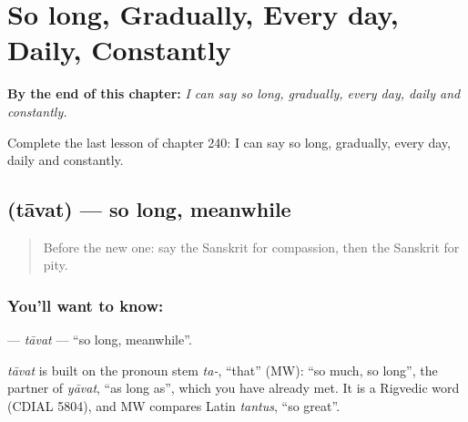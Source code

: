 
\chapter{So long, Gradually, Every day, Daily, Constantly}
\label{ch:sa-so-long-gradually-every-day-daily-constantly}

\begin{chapteropening}
\textbf{By the end of this chapter:} \emph{I can say so long, gradually, every day, daily and constantly.}

Complete the last lesson of chapter 240: I can say so long, gradually, every day, daily and constantly.
\end{chapteropening}

\section[\texorpdfstring{\sk{तावत्} (tāvat)}{तावत् (tāvat)}]{ (tāvat) — so long, meanwhile}

\label{lesson:SA-C240-tavat}



\begin{quote}
Before the new one: say the Sanskrit for compassion, then the Sanskrit for pity.
\end{quote}

\subsection*{You'll want to know: }
\textbf{} — \emph{tāvat} — \textquotedblleft{}so long, meanwhile\textquotedblright{}.

\begin{cousinweb}
\emph{tāvat} is built on the pronoun stem \emph{ta-}, \textquotedblleft{}that\textquotedblright{} (MW): \textquotedblleft{}so much, so long\textquotedblright{}, the partner of \emph{yāvat}, \textquotedblleft{}as long as\textquotedblright{}, which you have already met. It is a Rigvedic word (CDIAL 5804), and MW compares Latin \emph{tantus}, \textquotedblleft{}so great\textquotedblright{}.
\end{cousinweb}

